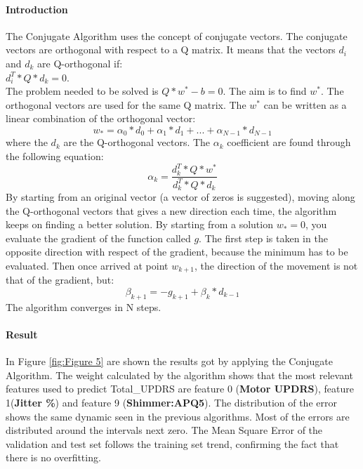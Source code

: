 \documentclass[12pt,a4paper,oneside]{article}
\begin{document}
	\paragraph{Introduction}
	The Conjugate Algorithm uses the concept of conjugate vectors. The conjugate vectors are orthogonal with respect to a Q matrix. It means that the vectors $d_{i}$ and $d_{k}$ are Q-orthogonal if:\\ $d_{i}^{T}*Q*d_{k}=0$.\\
	The problem needed to be solved is $Q*w^{*}-b=0$. The aim is to find $w^{*}$. The orthogonal vectors are used for the same Q matrix. The $w^{*}$ can be written as a linear combination of the orthogonal vector:
	\begin{equation}
		w_{*}=\alpha_{0}*d_{0}+\alpha_{1}*d_{1}+...+\alpha_{N-1}*d_{N-1}
	\end{equation}
	where the $d_{k}$ are the Q-orthogonal vectors. The $\alpha_{k}$ coefficient are found through the following equation:
	\begin{equation}
		\alpha_{k}=\frac{d_{k}^{T}*Q*w^{*}}{d_{k}^{T}*Q*d_{k}}
	\end{equation}
	By starting from an original vector (a vector of zeros is suggested), moving along the Q-orthogonal vectors that gives a new direction each time, the algorithm keeps on finding a better solution. By starting from a solution $w_{*}=0$, you evaluate the gradient of the function called $g$. The first step is taken in the opposite direction with respect of the gradient, because the minimum has to be evaluated. Then once arrived at point $w_{k+1}$, the direction of the movement is not that of the gradient, but:
	\begin{equation}
		\beta_{k+1}=-g_{k+1}+\beta_{k}*d_{k-1}
	\end{equation}
	The algorithm converges in N steps.
	\paragraph{Result} In Figure \ref{fig:Figure 5} are shown the results got by applying the Conjugate Algorithm. The weight calculated by the algorithm shows that the most relevant features used to predict Total\_UPDRS are feature 0 (\textbf{Motor UPDRS}), feature 1(\textbf{Jitter \%}) and feature 9 (\textbf{Shimmer:APQ5}). The distribution of the error shows the same dynamic seen in the previous algorithms. Most of the errors are distributed around the intervals next zero. The Mean Square Error of the validation and test set follows the training set trend, confirming the fact that there is no overfitting.
	
\end{document}
